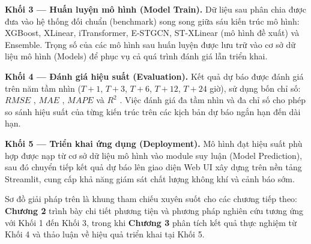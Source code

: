 \textbf{Khối 3 --- Huấn luyện mô hình (Model Train).} Dữ liệu sau phân chia được đưa vào hệ thống đối chuẩn (benchmark) song song giữa sáu kiến trúc mô hình: XGBoost, XLinear, iTransformer, E-STGCN, ST-XLinear (mô hình đề xuất) và Ensemble. Trọng số của các mô hình sau huấn luyện được lưu trữ vào cơ sở dữ liệu mô hình (Models) để phục vụ cả quá trình đánh giá lẫn triển khai.

\textbf{Khối 4 --- Đánh giá hiệu suất (Evaluation).} Kết quả dự báo được đánh giá trên năm tầm nhìn ($T+1$, $T+3$, $T+6$, $T+12$, $T+24$ giờ), sử dụng bốn chỉ số: $RMSE$ \cite{chai2014rmse}, $MAE$ \cite{willmott2005mae}, $MAPE$ \cite{armstrong1992mape} và $R^2$ \cite{nagelkerke1991r2}. Việc đánh giá đa tầm nhìn và đa chỉ số cho phép so sánh hiệu suất của từng kiến trúc trên các kịch bản dự báo ngắn hạn đến dài hạn.

\textbf{Khối 5 --- Triển khai ứng dụng (Deployment).} Mô hình đạt hiệu suất phù hợp được nạp từ cơ sở dữ liệu mô hình vào module suy luận (Model Prediction), sau đó chuyển tiếp kết quả dự báo lên giao diện Web UI xây dựng trên nền tảng Streamlit, cung cấp khả năng giám sát chất lượng không khí và cảnh báo sớm.

Sơ đồ giải pháp trên là khung tham chiếu xuyên suốt cho các chương tiếp theo: \textbf{Chương 2} trình bày chi tiết phương tiện và phương pháp nghiên cứu tương ứng với Khối 1 đến Khối 3, trong khi \textbf{Chương 3} phân tích kết quả thực nghiệm từ Khối 4 và thảo luận về hiệu quả triển khai tại Khối 5.

